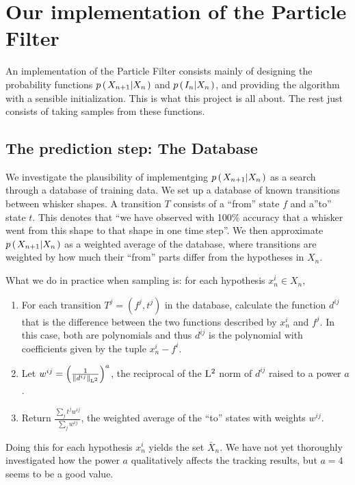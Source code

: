 \section*{Our implementation of the Particle Filter}
An implementation of the Particle Filter consists mainly of designing the probability functions $p\left(\left. X_{n+1} \middle\vert X_n \right.\right)$ and $p\left(\left. I_n \middle\vert X_n \right.\right)$, and providing the algorithm with a sensible initialization. This is what this project is all about. The rest just consists of taking samples from these functions.

\subsection*{The prediction step: The Database}

We investigate the plausibility of implementging $p\left(\left. X_{n+1} \middle\vert X_n \right.\right)$ as a search through a database of training data. We set up a database of known transitions between whisker shapes. A transition $T$ consists of a ``from'' state $f$ and a''to'' state $t$. This denotes that ``we have observed with 100\% accuracy that a whisker went from this shape to that shape in one time step''. We then approximate $p\left(\left. X_{n+1} \middle\vert X_n \right.\right)$ as a weighted average of the database, where transitions are weighted by how much their ``from'' parts differ from the hypotheses in $X_n$.

What we do in practice when sampling is: for each hypothesis $x_n^i \in X_n$,

\begin{enumerate}
  \item For each transition $T^j = (f^j, t^j)$ in the database, calculate the function $d^{ij}$ that is the difference between the two functions described by $x_n^i$ and $f^j$. In this case, both are polynomials and thus $d^{ij}$ is the polynomial with coefficients given by the tuple $x_n^i - f^i$.
  \item Let $w^{ij} = \left(\frac{1}{\left\|d^{ij}\right\|_{\mathrm{L}^2}}\right)^a$, the reciprocal of the $\mathrm{L}^2$ norm of $d^{ij}$ raised to a power $a$.
  \item Return $\frac{\sum_j t^j w^{ij}}{\sum_jw^{ij}}$, the weighted average of the ``to'' states with weights $w^{ij}$.
\end{enumerate}

Doing this for each hypothesis $x_n^i$ yields the set $\bar{X}_n$. We have not yet thoroughly investigated how the power $a$ qualitatively affects the tracking results, but $a=4$ seems to be a good value.

